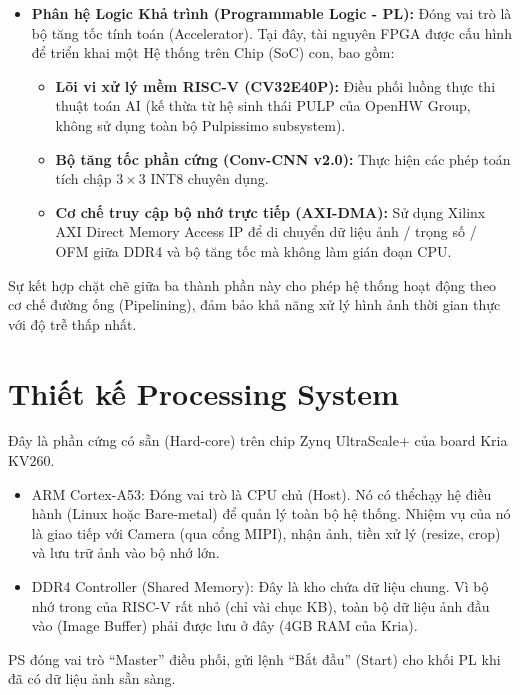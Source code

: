 \begin{itemize}
    \item \textbf{Phân hệ Logic Khả trình (Programmable Logic - PL):} 
    Đóng vai trò là bộ tăng tốc tính toán (Accelerator). Tại đây, tài nguyên FPGA được cấu hình để triển khai một Hệ thống trên Chip (SoC) con, bao gồm:
    \begin{itemize}
        \item \textbf{Lõi vi xử lý mềm RISC-V (CV32E40P):} Điều phối luồng thực thi thuật toán AI (kế thừa từ hệ sinh thái PULP của OpenHW Group, không sử dụng toàn bộ Pulpissimo subsystem).
        \item \textbf{Bộ tăng tốc phần cứng (Conv-CNN v2.0):} Thực hiện các phép toán tích chập $3\times3$ INT8 chuyên dụng.
        \item \textbf{Cơ chế truy cập bộ nhớ trực tiếp (AXI-DMA):} Sử dụng Xilinx AXI Direct Memory Access IP để di chuyển dữ liệu ảnh / trọng số / OFM giữa DDR4 và bộ tăng tốc mà không làm gián đoạn CPU.
    \end{itemize}
\end{itemize}

Sự kết hợp chặt chẽ giữa ba thành phần này cho phép hệ thống hoạt động theo cơ chế đường ống (Pipelining), đảm bảo khả năng xử lý hình ảnh thời gian thực với độ trễ thấp nhất.

\newpage
\section{Thiết kế Processing System}

Đây là phần cứng có sẵn (Hard-core) trên chip Zynq UltraScale+ của board Kria KV260.
\begin{itemize}
    \item ARM Cortex-A53: Đóng vai trò là CPU chủ (Host). Nó có thểchạy hệ điều hành (Linux hoặc Bare-metal) 
để quản lý toàn bộ hệ thống. Nhiệm vụ của nó là giao tiếp với Camera (qua cổng MIPI), 
nhận ảnh, tiền xử lý (resize, crop) và lưu trữ ảnh vào bộ nhớ lớn.
    \item DDR4 Controller (Shared Memory): Đây là kho chứa dữ liệu chung. Vì bộ nhớ trong của RISC-V 
rất nhỏ (chỉ vài chục KB), toàn bộ dữ liệu ảnh đầu vào (Image Buffer) phải được lưu ở đây 
(4GB RAM của Kria).
\end{itemize}

PS đóng vai trò ``Master'' điều phối, gửi lệnh ``Bắt đầu'' (Start) cho khối PL 
khi đã có dữ liệu ảnh sẵn sàng.

